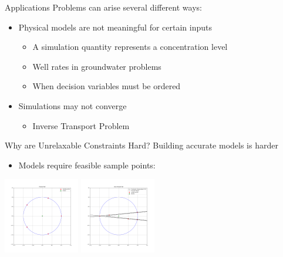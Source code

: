 \documentclass{beamer}
\begin{document}
\begin{frame}{Applications}
	Problems can arise several different ways:
	\begin{itemize}
		\setlength\itemsep{1.5em}
		\item Physical models are not meaningful for certain inputs
		\begin{itemize}
			\item A simulation quantity represents a concentration level
			\item Well rates in groundwater problems
			\item When decision variables must be ordered
		\end{itemize}
		\item Simulations may not converge
		\begin{itemize}
			\item Inverse Transport Problem \cite{Armstrong}
		\end{itemize}
	\end{itemize}
\end{frame}


\begin{frame}{Why are Unrelaxable Constraints Hard?}
	Building accurate models is harder
	\begin{itemize}
		\item Models require feasible sample points:
	\end{itemize}
	\begin{center}
		\includegraphics[width=125px]{images/poised.png}
		\includegraphics[width=125px]{images/not_poised.png}
	\end{center}
\end{frame}
\end{document}
